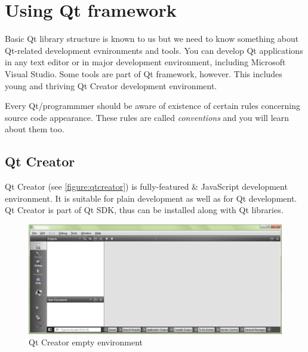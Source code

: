 \chapter{Using Qt framework}
Basic Qt library structure is known to us but we need to know something about Qt-related development evnironments and tools. You can develop Qt applications in any text editor or in major development environment, including Microsoft Visual Studio. Some tools are part of Qt framework, however. This includes young and thriving Qt Creator development environment.

Every Qt/\cpp programmmer should be aware of existence of certain rules concerning source code appearance. These rules are called \textit{conventions} and you will learn about them too.

\section{Qt Creator}
Qt Creator (see \autoref{figure:qtcreator}) is fully-featured \cpp \& JavaScript development environment. It is suitable for plain \cpp development as well as for Qt development. Qt Creator is part of Qt SDK, thus can be installed along with Qt libraries.

\begin{figure}[ht]
\centering
\includegraphics[width=14.5cm]{graphics/laboratory/03-qtcreator.png}
\caption{Qt Creator empty environment}\label{figure:qtcreator}
\end{figure}

